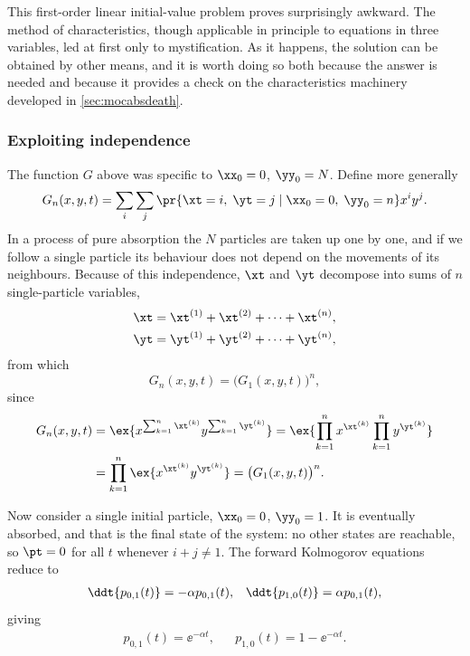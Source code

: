 This first-order linear initial-value problem proves surprisingly awkward. The method of
characteristics, though applicable in principle to equations in three variables, led at
first only to mystification. As it happens, the solution can be obtained by other means,
and it is worth doing so both because the answer is needed and because it provides a
check on the characteristics machinery developed in \cref{sec:mocabsdeath}.

\subsubsection*{Exploiting independence}

The function $G$ above was specific to $\xx_0=0$, $\yy_0=N$. Define more generally
\begin{equation*}
G_n(x,y,t) = \sum_i\sum_j \pr{\xt = i,\;\yt=j \;|\;\xx_0 = 0,\;\yy_0=n } x^i y^j .
\end{equation*}
In a process of pure absorption the $N$ particles are taken up one by one, and if we
follow a single particle its behaviour does not depend on the movements of its
neighbours. Because of this independence, $\xt$ and $\yt$ decompose into sums of $n$
single-particle variables,
\begin{align*}
\xt &= \xt^{(1)} + \xt^{(2)} + \dots + \xt^{(n)},\\
\yt &= \yt^{(1)} + \yt^{(2)} + \dots + \yt^{(n)},
\end{align*}
from which
\begin{equation}
\label{indRelPGF}
G_n(x,y,t) = \bigl(G_1(x,y,t)\bigr)^n ,
\end{equation}
since
\begin{align*}
G_n(x,y,t) &= \ex{x^{\sum_{k=1}^n \xt^{(k)}} y^{\sum_{k=1}^n \yt^{(k)}}}
= \ex{\prod_{k=1}^n x^{\xt^{(k)}} \prod_{k=1}^n y^{\yt^{(k)}}}\\
&= \prod_{k=1}^n\ex{x^{\xt^{(k)}} y^{\yt^{(k)}}}
= \bigl(G_1(x,y,t)\bigr)^n .
\end{align*}

Now consider a single initial particle, $\xx_0=0$, $\yy_0=1$. It is eventually absorbed,
and that is the final state of the system: no other states are reachable, so $\pt=0$ for
all $t$ whenever $i+j\neq1$. The forward Kolmogorov equations reduce to
\begin{align*}
\ddt{p_{0,1}(t)} = -\alpha p_{0,1}(t), && \ddt{p_{1,0}(t)} = \alpha p_{0,1}(t),
\end{align*}
giving
\begin{align*}
p_{0,1}(t) = \ee^{-\alpha t}, && p_{1,0}(t) = 1 - \ee^{-\alpha t} .
\end{align*}

